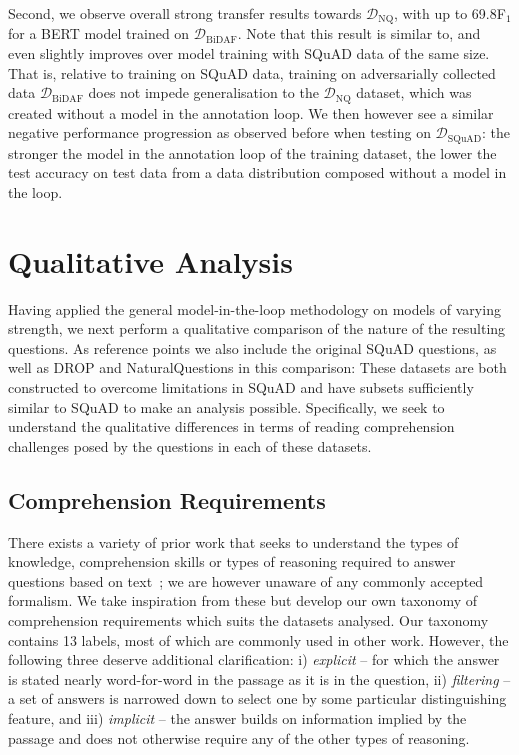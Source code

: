 \documentclass[11pt,a4paper]{article}
\newcommand{\dataset}[1]{\ensuremath{\mathcal{D_{\mathrm{#1}}}}}
\newcommand{\squad}{SQuAD}
\newcommand{\drop}{DROP}
\newcommand{\naturalquestions}{NaturalQuestions}
\newif\ifpagebreaks
\newif\ifarxiv
\begin{document}
\ifpagebreaks
    \pagebreak
\fi
Second, we observe overall strong transfer results towards \dataset{NQ}, with up to 69.8F$_\text{1}$ for a BERT model trained on \dataset{BiDAF}.
Note that this result is similar to, and even slightly improves over model training with \squad{} data of the same size.
That is, relative to training on SQuAD data, training on adversarially collected data \dataset{BiDAF} does not impede generalisation to the \dataset{NQ} dataset, which was created without a model in the annotation loop.
We then however see a similar negative performance progression as observed before when testing on \dataset{SQuAD}: the stronger the model in the annotation loop of the training dataset, the lower the test accuracy on test data from a data distribution composed without a model in the loop.



\section{Qualitative Analysis} \label{sec:qualitative}
Having applied the general model-in-the-loop methodology on models of varying strength, we next perform a qualitative comparison of the nature of the resulting questions.
As reference points we also include the original \squad{} questions, as well as \drop{} and \naturalquestions{} in this comparison: These datasets are both constructed to overcome limitations in \squad{} and have subsets sufficiently similar to \squad{} to make an analysis possible.
Specifically, we seek to understand the qualitative differences in terms of reading comprehension challenges posed by the questions in each of these datasets.


\subsection{Comprehension Requirements}
There exists a variety of prior work that seeks to understand the types of knowledge, comprehension skills or types of reasoning required to answer questions based on text~\cite{rajpurkar2016squad,clark2018think,sugawara2020assessing,dua2019drop,dasigi-etal-2019-quoref}; we are however unaware of any commonly accepted formalism.
We take inspiration from these but develop our own taxonomy of comprehension requirements which suits the datasets analysed\ifarxiv, see Appendix~\ref{sec:appendix_reasoning_types} for a detailed breakdown and examples of our annotation catalogue\fi.
{\ifarxiv}{\else}
Our taxonomy contains 13 labels, most of which are commonly used in other work.
However, the following three deserve additional clarification:
i) \textit{explicit} -- for which the answer is stated nearly word-for-word in the passage as it is in the question,
ii) \textit{filtering} -- a set of answers is narrowed down to select one by some particular distinguishing feature, and
iii) \textit{implicit} -- the answer builds on information implied by the passage and does not otherwise require any of the other types of reasoning.
{\fi}
\end{document}
